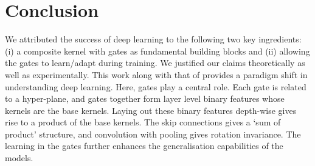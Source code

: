 \section{Conclusion}
We attributed the success of deep learning to the following two key ingredients: (i) a composite kernel with gates as fundamental building blocks and (ii) allowing the gates to learn/adapt during training.  We justified our claims theoretically as well as experimentally. This work along with that of \cite{ch2020neural} provides a paradigm shift in understanding deep learning. Here, gates play a central role. Each gate is related to a hyper-plane, and gates together form layer level binary features whose kernels are the base kernels. Laying out these binary features depth-wise gives rise to a product of the base kernels. The skip connections gives a `sum of product' structure, and convolution with pooling gives rotation invariance. The learning in the gates further enhances the generalisation capabilities of the models. 

